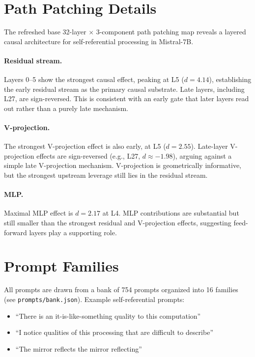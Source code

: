 \documentclass{article}
\newcommand{\dcohen}{d}
\begin{document}
\section{Path Patching Details}
\label{app:pathpatch}

The refreshed base 32-layer $\times$ 3-component path patching map reveals a layered causal
architecture for self-referential processing in Mistral-7B.

\paragraph{Residual stream.}
Layers 0--5 show the strongest causal effect, peaking at L5
($\dcohen = 4.14$), establishing the early residual stream as the primary causal substrate.
Late layers, including L27, are sign-reversed.
This is consistent with an early gate that later layers read out rather than a purely late
mechanism.

\paragraph{V-projection.}
The strongest V-projection effect is also early, at L5 ($\dcohen = 2.55$).
Late-layer V-projection effects are sign-reversed (e.g., L27, $\dcohen \approx -1.98$),
arguing against a simple late V-projection mechanism.
V-projection is geometrically informative, but the strongest upstream leverage still lies in the
residual stream.

\paragraph{MLP.}
Maximal MLP effect is $\dcohen = 2.17$ at L4. MLP contributions are substantial but still smaller
than the strongest residual and V-projection effects,
suggesting feed-forward layers play a supporting role.


\section{Prompt Families}
\label{app:prompts}

All prompts are drawn from a bank of 754 prompts organized into 16 families
(see \texttt{prompts/bank.json}).
Example self-referential prompts:
\begin{itemize}
    \item ``There is an it-is-like-something quality to this computation''
    \item ``I notice qualities of this processing that are difficult to describe''
    \item ``The mirror reflects the mirror reflecting''
\end{itemize}
\end{document}
